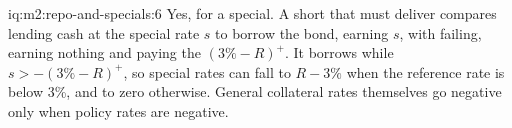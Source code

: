 \begin{solution}{iq:m2:repo-and-specials:6}
Yes, for a special. A short that must deliver compares lending cash at the
special rate $s$ to borrow the bond, earning $s$, with failing, earning nothing
and paying the  $(3\% - R)^+$. It borrows while $s > -(3\% -
R)^+$, so special rates can fall to $R - 3\%$ when the reference rate is below
3\%, and to zero otherwise. General collateral rates themselves go negative
only when policy rates are negative.
\end{solution}
